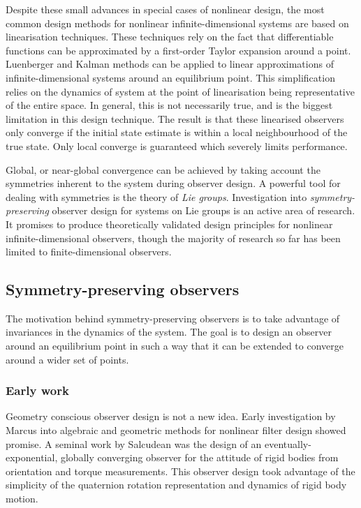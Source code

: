 Despite these small advances in special cases of nonlinear design, the most common design methods for nonlinear infinite-dimensional systems are based on linearisation techniques. These techniques rely on the fact that differentiable functions can be approximated by a first-order Taylor expansion around a point. Luenberger and Kalman methods can be applied to linear approximations of infinite-dimensional systems around an equilibrium point. This simplification relies on the dynamics of system at the point of linearisation being representative of the entire space. In general, this is not necessarily true, and is the biggest limitation in this design technique. The result is that these linearised observers only converge if the initial state estimate is within a local neighbourhood of the true state. Only local converge is guaranteed which severely limits performance.

Global, or near-global convergence can be achieved by taking account the symmetries inherent to the system during observer design. A powerful tool for dealing with symmetries is the theory of \textit{Lie groups}. Investigation into \textit{symmetry-preserving} observer design for systems on Lie groups is an active area of research. It promises to produce theoretically validated design principles for nonlinear infinite-dimensional observers, though the majority of research so far has been limited to finite-dimensional observers.

\subsection{Symmetry-preserving observers}
The motivation behind symmetry-preserving observers is to take advantage of invariances in the dynamics of the system. The goal is to design an observer around an equilibrium point in such a way that it can be extended to converge around a wider set of points.

\subsubsection{Early work}
Geometry conscious observer design is not a new idea. Early investigation by Marcus \cite{marcus1984algebraic} into algebraic and geometric methods for nonlinear filter design showed promise.
A seminal work by Salcudean \cite{salcudean1991globally} was the design of an eventually-exponential, globally converging observer for the attitude of rigid bodies from orientation and torque measurements. This observer design took advantage of the simplicity of the quaternion rotation representation and dynamics of rigid body motion.

